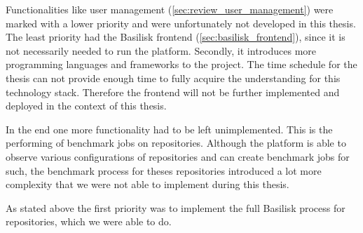 Functionalities like user management (\ref{sec:review_user_management}) were marked with a lower priority and were unfortunately not developed in this thesis.
The least priority had the Basilisk frontend (\ref{sec:basilisk_frontend}), since it is not necessarily needed to run the platform.
Secondly, it introduces more programming languages and frameworks to the project.
The time schedule for the thesis can not provide enough time to fully acquire the understanding for this technology stack.
Therefore the frontend will not be further implemented and deployed in the context of this thesis.

In the end one more functionality had to be left unimplemented.
This is the performing of benchmark jobs on \gh{} repositories.
Although the platform is able to observe various configurations of \gh{} repositories and can create benchmark jobs for such, the benchmark process for theses repositories introduced a lot more complexity that we were not able to implement during this thesis.

As stated above the first priority was to implement the full Basilisk process for \dockh{} repositories, which we were able to do.









	